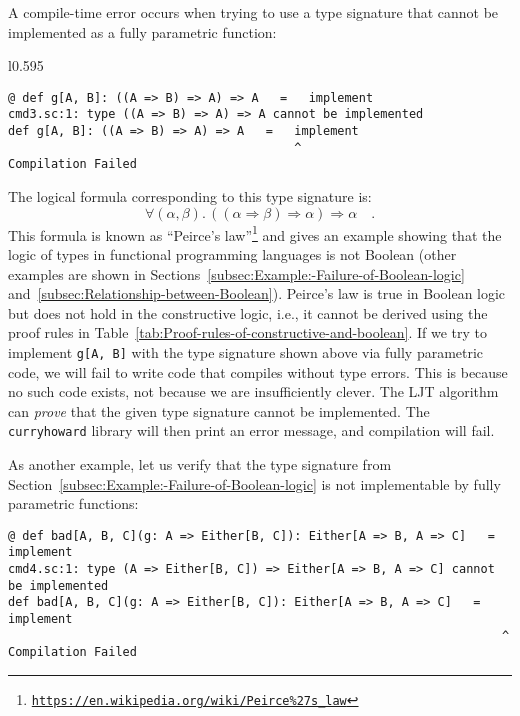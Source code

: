 A compile-time error occurs when trying to use a type signature that
cannot be implemented as a fully parametric function:

\begin{wrapfigure}{l}{0.595\columnwidth}%
\vspace{-0.95\baselineskip}
\begin{lstlisting}
@ def g[A, B]: ((A => B) => A) => A   =   implement
cmd3.sc:1: type ((A => B) => A) => A cannot be implemented
def g[A, B]: ((A => B) => A) => A   =   implement
                                        ^
Compilation Failed
\end{lstlisting}

\vspace{-0.7\baselineskip}
\end{wrapfigure}%

\noindent The logical formula corresponding to this type signature
is:\vspace{-0\baselineskip}
\begin{equation}
\forall(\alpha,\beta).\,\left(\left(\alpha\Rightarrow\beta\right)\Rightarrow\alpha\right)\Rightarrow\alpha\quad.\label{eq:ch-example-3-peirce-law}
\end{equation}
This formula is known as \textsf{``}Peirce\textsf{'}s law\textsf{''}\footnote{\texttt{\href{https://en.wikipedia.org/wiki/Peirce\%27s_law}{https://en.wikipedia.org/wiki/Peirce\%27s\_law}}}
and gives an example showing that the logic of types in functional
programming languages is not Boolean (other examples are shown in
Sections~\ref{subsec:Example:-Failure-of-Boolean-logic} and~\ref{subsec:Relationship-between-Boolean}).
Peirce\textsf{'}s law is true in Boolean logic but does not hold in the constructive
logic, i.e., it cannot be derived using the proof rules in Table~\ref{tab:Proof-rules-of-constructive-and-boolean}.
If we try to implement \lstinline!g[A, B]! with the type signature
shown above via fully parametric code, we will fail to write code
that compiles without type errors. This is because no such code exists,
\textemdash{} not because we are insufficiently clever. The LJT algorithm
can \emph{prove} that the given type signature cannot be implemented.
The \texttt{curryhoward} library will then print an error message,
and compilation will fail.

As another example, let us verify that the type signature from Section~\ref{subsec:Example:-Failure-of-Boolean-logic}
is not implementable by fully parametric functions:
\begin{lstlisting}
@ def bad[A, B, C](g: A => Either[B, C]): Either[A => B, A => C]   =   implement
cmd4.sc:1: type (A => Either[B, C]) => Either[A => B, A => C] cannot be implemented
def bad[A, B, C](g: A => Either[B, C]): Either[A => B, A => C]   =   implement
                                                                     ^
Compilation Failed
\end{lstlisting}

